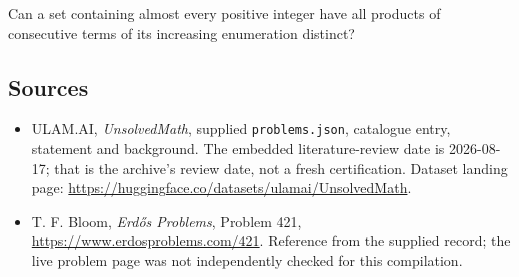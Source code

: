 \documentclass[11pt,a4paper]{article}
\begin{document}
Can a set containing almost every positive integer have all products of consecutive terms of its increasing enumeration distinct?

\subsection{Sources}

{\small

\begin{itemize}

\item[\hypertarget{source:statement:1}{S1}] ULAM.AI, \emph{UnsolvedMath}, supplied \texttt{problems.json}, catalogue entry, statement and background. The embedded literature-review date is 2026-08-17; that is the archive’s review date, not a fresh certification. Dataset landing page: \url{https://huggingface.co/datasets/ulamai/UnsolvedMath}.

\item[\hypertarget{source:statement:2}{S2}] T. F. Bloom, \emph{Erdős Problems}, Problem 421, \url{https://www.erdosproblems.com/421}. Reference from the supplied record; the live problem page was not independently checked for this compilation.

\end{itemize}

}

\label{end:statement}
\end{document}
